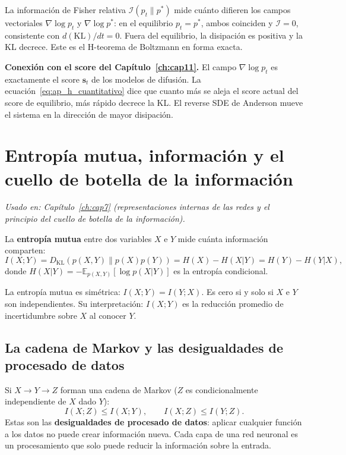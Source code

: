 La información de Fisher relativa $\mathcal{I}(p_t\|p^*)$ mide cuánto difieren
los campos vectoriales $\nabla\log p_t$ y $\nabla\log p^*$: en el equilibrio
$p_t = p^*$, ambos coinciden y $\mathcal{I} = 0$, consistente con $d(\mathrm{KL})/dt
= 0$. Fuera del equilibrio, la disipación es positiva y la KL decrece. Este es
el H-teorema de Boltzmann en forma exacta.

\medskip\noindent\textbf{Conexión con el score del Capítulo~\ref{ch:cap11}.}
El campo $\nabla\log p_t$ es exactamente el score $\bm{s}_t$ de los modelos de
difusión. La ecuación~\eqref{eq:ap_h_cuantitativo} dice que cuanto más se aleja
el score actual del score de equilibrio, más rápido decrece la KL. El reverse
SDE de Anderson mueve el sistema en la dirección de mayor disipación.

\section{Entropía mutua, información y el cuello de botella de la información}
\label{sec:ap_info_mutua}

\textit{Usado en: Capítulo~\ref{ch:cap7} (representaciones internas de las redes
y el principio del cuello de botella de la información).}

\medskip
La \textbf{entropía mutua} entre dos variables $X$ e $Y$ mide cuánta información
comparten:
\begin{equation}
  I(X;Y) = D_{\mathrm{KL}}(p(X,Y)\|p(X)p(Y))
  = H(X) - H(X|Y) = H(Y) - H(Y|X),
  \label{eq:ap_mutua}
\end{equation}
donde $H(X|Y) = -\mathbb{E}_{p(X,Y)}[\log p(X|Y)]$ es la entropía condicional.

La entropía mutua es simétrica: $I(X;Y) = I(Y;X)$. Es cero si y solo si $X$
e $Y$ son independientes. Su interpretación: $I(X;Y)$ es la reducción promedio
de incertidumbre sobre $X$ al conocer $Y$.

\subsection*{La cadena de Markov y las desigualdades de procesado de datos}

Si $X \to Y \to Z$ forman una cadena de Markov ($Z$ es condicionalmente
independiente de $X$ dado $Y$):
\begin{equation}
  I(X;Z) \leq I(X;Y), \qquad I(X;Z) \leq I(Y;Z).
  \label{eq:ap_dpi}
\end{equation}
Estas son las \textbf{desigualdades de procesado de datos}: aplicar cualquier
función a los datos no puede crear información nueva. Cada capa de una red
neuronal es un procesamiento que solo puede reducir la información sobre la
entrada.

